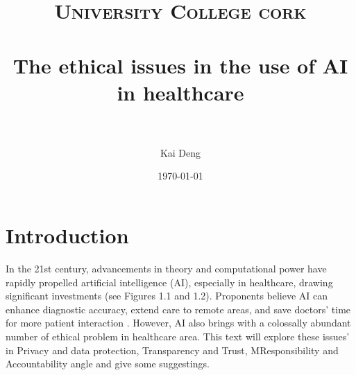 \documentclass[paper=a4, fontsize=11pt]{scrartcl} %
\title{	
\normalfont \normalsize 
\textsc{University College cork} \\ [25pt] %
\horrule{0.5pt} \\[0.4cm] %
\huge The ethical issues in the use of AI in healthcare \\ %
\horrule{2pt} \\[0.5cm] %
}
\author{Kai Deng} %
\date{\normalsize\today} %
\numberwithin{equation}{section} %
\numberwithin{figure}{section} %
\numberwithin{table}{section} %
\begin{document}
\maketitle %


\section{Introduction}

In the 21st century, advancements in theory and computational power have rapidly propelled 
artificial intelligence (AI), especially in healthcare, drawing significant investments (see Figures 1.1 and 1.2). 
Proponents believe AI can enhance diagnostic accuracy, extend care to remote areas, and save doctors' 
time for more patient interaction \cite{frostPublicViewsEthical2022}. However, AI also brings with a 
colossally abundant number of ethical problem in healthcare area. This text will explore these issues' 
in Privacy and data protection, Transparency and Trust, MResponsibility and Accountability angle and give some suggestings.
\end{document}
